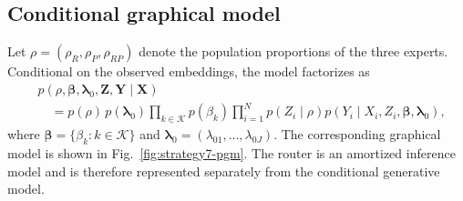 \subsection{Conditional graphical model}

Let $\rho=(\rho_R,\rho_P,\rho_{RP})$ denote the population proportions of the
three experts. Conditional on the observed embeddings, the model factorizes as
\begin{align}
&p(\rho,\boldsymbol{\beta},\boldsymbol{\lambda}_0,
        \boldsymbol{Z},\boldsymbol{Y}\mid\boldsymbol{X}) \nonumber\\
&\quad =p(\rho)\,p(\boldsymbol{\lambda}_0)
    \prod_{k\in\mathcal K}p(\beta_k)
    \prod_{i=1}^{N}
    p(Z_i\mid\rho)
    p(Y_i\mid X_i,Z_i,\boldsymbol{\beta},\boldsymbol{\lambda}_0),
\label{eq:conditional-factorization}
\end{align}
where $\boldsymbol{\beta}=\{\beta_k:k\in\mathcal K\}$ and
$\boldsymbol{\lambda}_0=(\lambda_{01},\ldots,\lambda_{0J})$. The corresponding
graphical model is shown in Fig.~\ref{fig:strategy7-pgm}. The router is an
amortized inference model and is therefore represented separately from the
conditional generative model.


